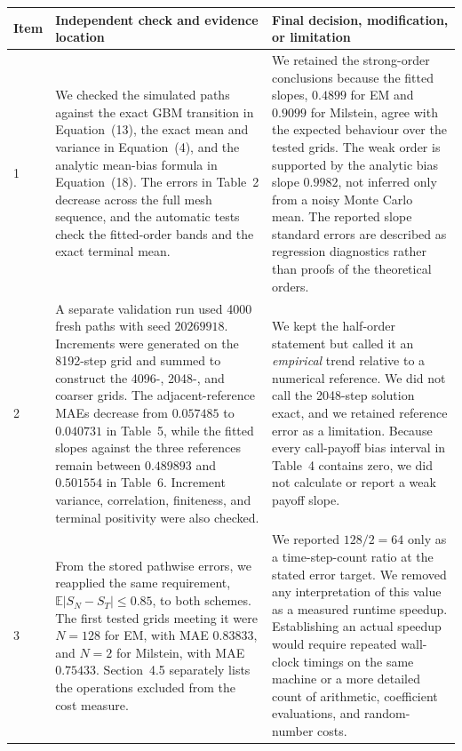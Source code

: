 \documentclass[11pt,a4paper]{article}
\theoremstyle{definition}
\theoremstyle{remark}
\begin{document}
\begin{tabular}{|p{}|p{}|p{}|}
\hline
\textbf{Item} &
\textbf{Independent check and evidence location} &
\textbf{Final decision, modification, or limitation} \\
\hline

1 &
We checked the simulated paths against the exact GBM transition in Equation~(13), the exact mean and variance in Equation~(4), and the analytic mean-bias formula in Equation~(18). The errors in Table~2 decrease across the full mesh sequence, and the automatic tests check the fitted-order bands and the exact terminal mean. &
We retained the strong-order conclusions because the fitted slopes, \(0.4899\) for EM and \(0.9099\) for Milstein, agree with the expected behaviour over the tested grids. The weak order is supported by the analytic bias slope \(0.9982\), not inferred only from a noisy Monte Carlo mean. The reported slope standard errors are described as regression diagnostics rather than proofs of the theoretical orders. \\

\addlinespace

2 &
A separate validation run used 4000 fresh paths with seed \(20269918\). Increments were generated on the 8192-step grid and summed to construct the 4096-, 2048-, and coarser grids. The adjacent-reference MAEs decrease from \(0.057485\) to \(0.040731\) in Table~5, while the fitted slopes against the three references remain between \(0.489893\) and \(0.501554\) in Table~6. Increment variance, correlation, finiteness, and terminal positivity were also checked. &
We kept the half-order statement but called it an \emph{empirical} trend relative to a numerical reference. We did not call the 2048-step solution exact, and we retained reference error as a limitation. Because every call-payoff bias interval in Table~4 contains zero, we did not calculate or report a weak payoff slope. \\

\addlinespace

3 &
From the stored pathwise errors, we reapplied the same requirement,
\(\mathbb{E}|S_N-S_T|\leq 0.85\), to both schemes. The first tested grids meeting it were \(N=128\) for EM, with MAE \(0.83833\), and \(N=2\) for Milstein, with MAE \(0.75433\). Section~4.5 separately lists the operations excluded from the cost measure. &
We reported \(128/2=64\) only as a time-step-count ratio at the stated error target. We removed any interpretation of this value as a measured runtime speedup. Establishing an actual speedup would require repeated wall-clock timings on the same machine or a more detailed count of arithmetic, coefficient evaluations, and random-number costs. \\

\hline
\end{tabular}
\end{document}

